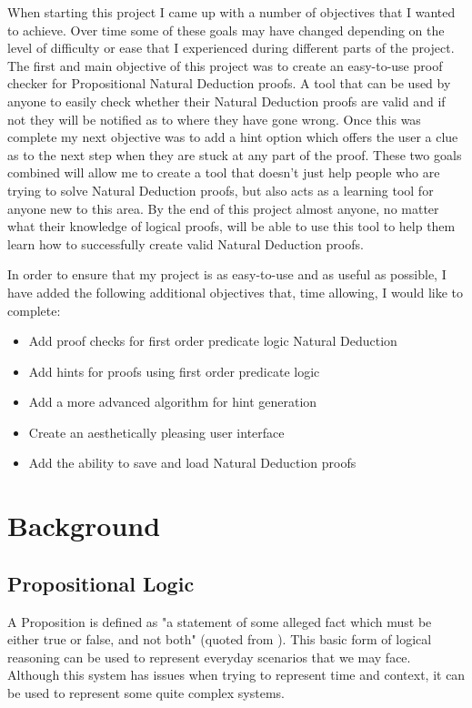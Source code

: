 When starting this project I came up with a number of objectives that I wanted to achieve. Over time some of these goals may have changed depending on the level of difficulty or ease that I experienced during different parts of the project. The first and main objective of this project was to create an easy-to-use proof checker for Propositional Natural Deduction proofs. A tool that can be used by anyone to easily check whether their Natural Deduction proofs are valid and if not they will be notified as to where they have gone wrong. Once this was complete my next objective was to add a hint option which offers the user a clue as to the next step when they are stuck at any part of the proof. These two goals combined will allow me to create a tool that doesn't just help people who are trying to solve Natural Deduction proofs, but also acts as a learning tool for anyone new to this area. By the end of this project almost anyone, no matter what their knowledge of logical proofs, will be able to use this tool to help them learn how to successfully create valid Natural Deduction proofs.

In order to ensure that my project is as easy-to-use and as useful as possible, I have added the following additional objectives that, time allowing, I would like to complete:
\begin{itemize}
\item Add proof checks for first order predicate logic Natural Deduction
\item Add hints for proofs using first order predicate logic
\item Add a more advanced algorithm for hint generation
\item Create an aesthetically pleasing user interface
\item Add the ability to save and load Natural Deduction proofs
\end{itemize}

\pagebreak

\section{Background \label{Background}}

\subsection{Propositional Logic}

A Proposition is defined as "a statement of some alleged fact which must be either true or false, and not both" (quoted from \cite{ndBook}). This basic form of logical reasoning can be used to represent everyday scenarios that we may face. Although this system has issues when trying to represent time and context, it can be used to represent some quite complex systems.

